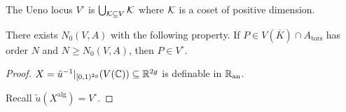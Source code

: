 \documentclass{beamer}
\begin{document}
\begin{frame}
  The \alert{Ueno locus} $V^{\circ}$  is $\bigcup_{{\mathcal K}\subseteq V} {\mathcal K}$ where ${\mathcal K}$ is
  a coset of positive dimension. 


  \begin{lemma}
    There exists $N_0(V,A)$ with the following property. If
    $P\in V(\overline K)\cap A_{\mathrm{tors}}$ has order $N$
    and $N\ge N_0(V,A)$, then $P\in V^{\circ}$.
  \end{lemma}
  \begin{proof}\renewcommand{\qedsymbol}{}
    $X = \tilde u^{-1}|_{[0,1)^{2g}}(V({\mathbb{C}})) \subseteq {\mathbb{R}}^{2g}$
    is definable in ${{\mathbb{R}}_{\mathrm{an}}}$.

    Recall $\tilde u(X^{\mathrm{alg}}) = V^{\circ}$.

    \vspace{3cm}



  \end{proof}
\end{frame}
\end{document}

